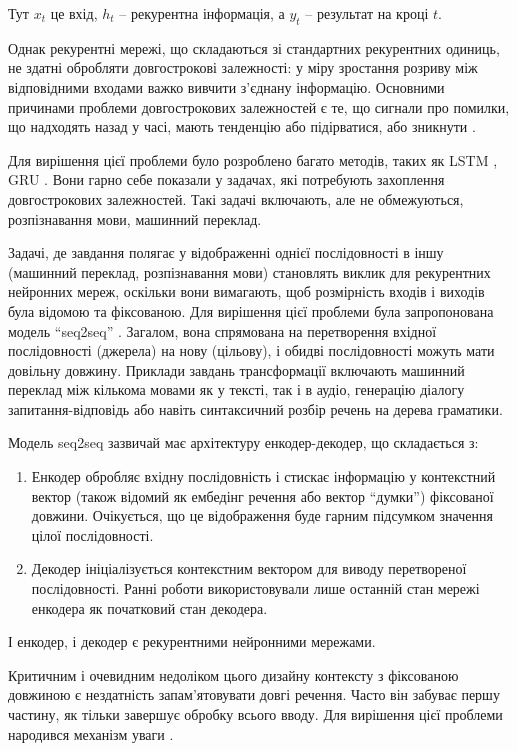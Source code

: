 Тут $x_t$ це вхід, $h_t$ -- рекурентна інформація, а $y_t$ -- 
результат на кроці $t$.

Однак рекурентні мережі, що складаються зі стандартних рекурентних
одиниць, не здатні обробляти довгострокові залежності: у міру
зростання розриву між відповідними входами важко
вивчити з'єднану інформацію. Основними причинами проблеми
довгострокових залежностей є те, що сигнали про помилки,
що надходять назад у часі, мають тенденцію або підірватися,
або зникнути \cite{nn:recurrent-hard}.

Для вирішення цієї проблеми було розроблено багато
методів, таких як LSTM \cite{nn:lstm}, GRU \cite{nn:gru}. Вони
гарно себе показали у задачах, які потребують захоплення
довгострокових залежностей. Такі задачі включають, але не обмежуються,
розпізнавання мови, машинний переклад.

Задачі, де завдання полягає у відображенні однієї послідовності в
іншу (машинний переклад, розпізнавання мови) становлять
виклик для рекурентних
нейронних мереж, оскільки вони вимагають, щоб розмірність
входів і виходів була відомою та фіксованою.
Для вирішення цієї проблеми була запропонована
модель ``seq2seq'' \cite{nn:seq2seq}. Загалом, вона спрямована
на перетворення вхідної послідовності (джерела) на нову (цільову),
і обидві послідовності можуть мати довільну довжину.
Приклади завдань трансформації включають машинний переклад
між кількома мовами як у тексті, так і в аудіо,
генерацію діалогу запитання-відповідь або навіть синтаксичний
розбір речень на дерева граматики.

Модель seq2seq зазвичай має архітектуру енкодер-декодер, що складається з:

\begin{enumerate}[label=--]
    \item Енкодер обробляє вхідну послідовність і стискає інформацію
    у контекстний вектор (також відомий як ембедінг речення
    або вектор ``думки'') фіксованої довжини. Очікується,
    що це відображення буде гарним підсумком значення
    цілої послідовності.
    \item Декодер ініціалізується контекстним вектором для
    виводу перетвореної послідовності. Ранні роботи
    використовували лише останній стан мережі
    енкодера як початковий стан декодера.
\end{enumerate}

І енкодер, і декодер є рекурентними нейронними мережами.

Критичним і очевидним недоліком цього дизайну контексту з
фіксованою довжиною є нездатність запам'ятовувати довгі речення.
Часто він забуває першу частину, як тільки завершує обробку всього
вводу. Для вирішення цієї проблеми народився
механізм уваги \cite{nn:attention}.


